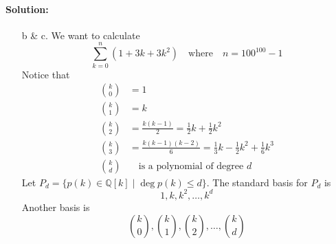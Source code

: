 \documentclass[a4paper,notitlepage]{article}
\makeatletter
\theoremstyle{plain}
\theoremstyle{definition}
\newcommand{\leqnomode}{\tagsleft@true}
\makeatother
\begin{document}
\paragraph{Solution:}
\begin{enumerate}
    \item[b \& c.] We want to calculate
        \begin{equation*}
            \sum_{k=0}^n (1+3k+3k^2) \quad \text{where}\quad n=100^{100}-1
        \end{equation*}
        Notice that
        \leqnomode
        \begin{align*}
            \binom{k}{0} &= 1 \\
            \binom{k}{1} &= k \\
            \binom{k}{2} &= \frac{k(k-1)}{2} = \frac{1}{2}k + \frac{1}{2}k^2 \\
            \binom{k}{3} &= \frac{k(k-1)(k-2)}{6} = \frac{1}{3}k - \frac{1}{2}k^2 + \frac{1}{6}k^3 \\
            \tag*{and in general}
            \binom{k}{d} &\quad \text{is a polynomial of degree $d$}
        \end{align*}
        Let $P_d = \{ p(k) \in \mathbb{Q}[k] \mid \deg p(k) \leq d\}$.
        The standard basis for $P_d$ is
        \begin{equation*}
            1, k, k^2,\dots,k^d
        \end{equation*}
        Another basis is
        \begin{equation*}
            \binom{k}{0}, \binom{k}{1}, \binom{k}{2},\dots, \binom{k}{d}
        \end{equation*}


\end{enumerate}
\end{document}
